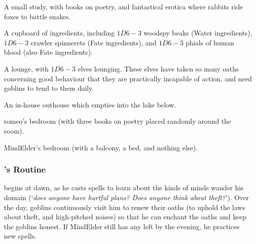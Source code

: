 \begin{multicols}{2}
\null
\begin{dlist}
  \item
  A small study, with books on poetry, and fantastical erotica where rabbits ride foxes to battle snakes.
  \item
  A cupboard of \glspl{ingredient}, including $1D6-3$ woodspy beaks (Water \glspl{ingredient}), $1D6-3$ \gls{crawler} spinnerets (Fate \glspl{ingredient}), and $1D6-3$ phials of human blood (also Fate \glspl{ingredient}).
  \item
  A lounge, with $1D6-3$ elves lounging.
  These elves have taken so many oaths concerning good behaviour that they are practically incapable of action, and need goblins to tend to them daily.
  \item
  An in-house outhouse which empties into the lake below.
  \item
  \gls{romeo}'s bedroom (with three books on poetry placed randomly around the room).
  \item
  \gls{MindElder}'s bedroom (with a balcony, a bed, and nothing else).
\end{dlist}

\subsubsection{'s Routine}
begins at dawn, as he casts spells to learn about the kinds of minds wander his domain (`\textit{does anyone have hurtful plans?  Does anyone think about theft?}').
Over the day, goblins continuously visit him to renew their oaths (to uphold the laws about theft, and high-pitched noises) so that he can enchant the oaths and keep the goblins honest.
If \gls{MindElder} still has any  left by the evening, he practices new spells.

\MindElder

\showStdSpells[
  
  
  
  
]

\end{multicols}
